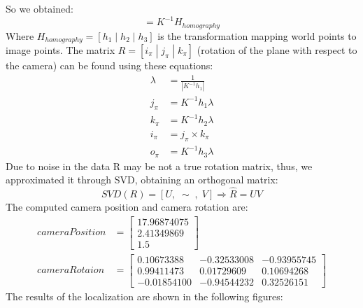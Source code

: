 \documentclass[11pt, oneside]{article}
\begin{document}
So we obtained:
\begin{equation}
	[j_\pi | k_\pi | o_\pi]= K^{-1}H_{homography} 
\end{equation}
Where $H_{homography} = [h_1\; |\; h_2\; |\; h_3]$ is the transformation mapping world points to image points. The matrix $R=[i_\pi\; | \; j_\pi \; | \; k_\pi]$ (rotation of the plane with respect to the camera) can be found using these equations:
\begin{subequations}
	\begin{align*}
		\lambda &= \frac{1}{|K^{-1}h_1|} \\
		j_\pi &= K^{-1}h_1\lambda \\
		k_\pi &= K^{-1}h_2\lambda \\
		i_\pi &= j_\pi \times k_\pi  \\
		o_\pi &= K^{-1} h_3 \lambda
	\end{align*}
\end{subequations}
Due to noise in the data R may be not a true rotation matrix, thus, we approximated it through SVD, obtaining an orthogonal matrix:
\begin{equation}
	SVD(R) = [U,\; \sim\;,\;V] \Rightarrow \hat{R} = UV
\end{equation}
The computed camera position and camera rotation are:
\begin{subequations}
	\begin{align*}
	cameraPosition &=
	\begin{bmatrix}
		17.96874075 \\ 2.41349869 \\ 1.5
	\end{bmatrix}
	\\
	cameraRotaion &= 
	\begin{bmatrix}
		0.10673388 & -0.32533008 & -0.93955745 \\
		0.99411473 & 0.01729609 & 0.10694268 \\
		-0.01854100 & -0.94544232 & 0.32526151
	\end{bmatrix}
	\end{align*}
\end{subequations} 
The results of the localization are shown in the following figures:
\end{document}
